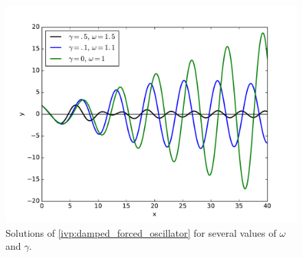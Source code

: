 \begin{figure}[ht]
\centering
\includegraphics[width=\textwidth]{damped_forced_oscillator.pdf}
\caption{Solutions of \eqref{ivp:damped_forced_oscillator} for several values of $\omega$ and $\gamma$.}
\label{ivp:damped_forced_oscillator_figure}
\end{figure}
